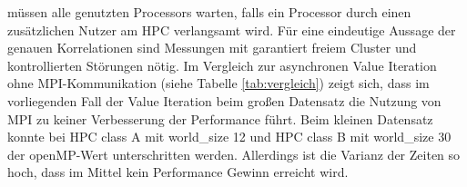 müssen alle genutzten Processors warten, falls ein Processor durch einen zusätzlichen Nutzer am HPC verlangsamt wird.
Für eine eindeutige Aussage der genauen Korrelationen sind Messungen mit garantiert freiem Cluster und kontrollierten Störungen nötig.
Im Vergleich zur asynchronen Value Iteration ohne MPI-Kommunikation (siehe Tabelle \ref{tab:vergleich}) zeigt sich, dass im vorliegenden Fall der Value Iteration beim großen Datensatz die Nutzung von MPI zu keiner Verbesserung der
Performance führt.
Beim kleinen Datensatz konnte bei HPC class A mit world\_size 12 und HPC class B mit world\_size 30 der openMP-Wert unterschritten werden.
Allerdings ist die Varianz der Zeiten so hoch, dass im Mittel kein Performance Gewinn erreicht wird.

\begin{table}[h]
\caption{Vergleich der runtime von openMP und MPI}
\end{table}